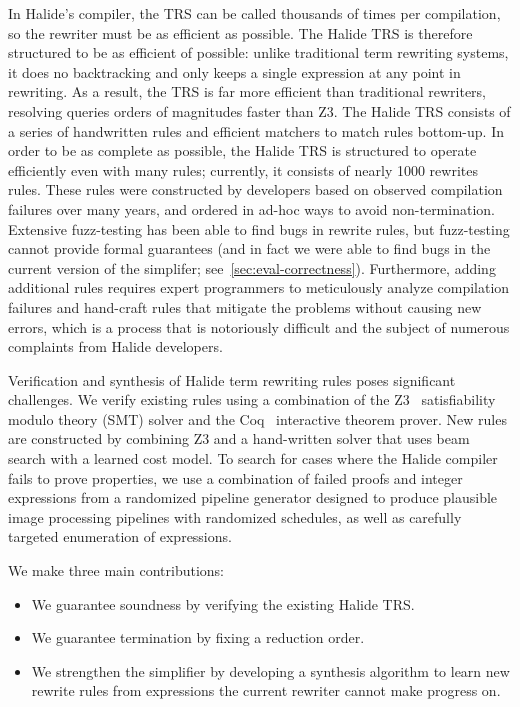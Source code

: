 \documentclass[sigplan,10pt,review,anonymous]{acmart}\settopmatter{printfolios=true,printccs=false,printacmref=false}
\begin{document}
In Halide's compiler, the TRS can be called thousands of times per
compilation, so the rewriter must be as efficient as possible.  The Halide
TRS is therefore structured to be as efficient of possible: unlike traditional
term rewriting systems, it does no backtracking and only keeps a single expression
at any point in rewriting.  As a result, the TRS is far more efficient than traditional
rewriters, resolving queries orders of magnitudes faster than Z3.
The Halide TRS consists of a series of handwritten rules and efficient matchers
to match rules bottom-up. In order to be as complete as possible, the Halide TRS is structured
to operate efficiently even with many rules; currently, it consists of nearly 1000
rewrites rules.  These rules were constructed by developers based on
observed compilation failures over many years, and ordered in ad-hoc ways to
avoid non-termination. Extensive fuzz-testing has been able to find bugs in
rewrite rules, but fuzz-testing cannot provide formal guarantees (and in fact we
were able to find bugs in the current version of the simplifer;
see~\ref{sec:eval-correctness}). Furthermore, adding additional rules requires
expert programmers to meticulously analyze compilation failures and hand-craft
rules that mitigate the problems without causing new errors, which is a process
that is notoriously difficult and the subject of numerous complaints from
Halide developers.

Verification and synthesis
of Halide term rewriting rules poses significant challenges. We verify
existing rules using a combination of the Z3~\cite{de2008z3} satisfiability
modulo theory (SMT) solver and the Coq~\cite{coq19} interactive theorem prover. 
New rules are constructed by combining Z3 and a hand-written solver that uses beam
search with a learned cost model. To search for cases where the Halide compiler
fails to prove properties, we use a combination of failed proofs and integer expressions
from a randomized pipeline generator designed to produce plausible image processing
pipelines with randomized schedules, as well as carefully targeted enumeration
of expressions.

We make three main contributions:
\begin{itemize}
  \item We guarantee soundness by verifying the existing Halide TRS.
  \item We guarantee termination by fixing a reduction order.
  \item We strengthen the simplifier by developing a synthesis algorithm to learn new rewrite rules from expressions the current rewriter cannot make progress on.
\end{itemize}
\end{document}
